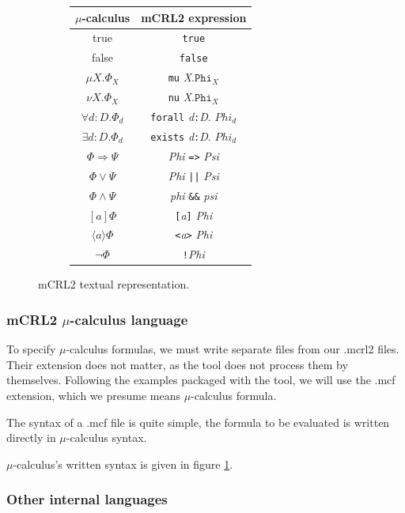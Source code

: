 \documentclass[11pt]{article}
\theoremstyle{definition}
\theoremstyle{plain}
\begin{document}
\begin{figure}
\begin{subfigure}{0.49\textwidth}
\begin{tabular}{c c}
	$ \mu $-calculus & mCRL2 expression \\
	\hline
	true & \texttt{true} \\
	false & \texttt{false} \\
	$ \mu X.\Phi_X $ & \texttt{mu} \textit{X}$ \texttt{.Phi}_\textit{X} $ \\
	$ \nu X.\Phi_X $ & \texttt{nu} \textit{X}$ \texttt{.Phi}_\textit{X} $ \\
	$ \forall d:D.\Phi_d $ & \texttt{forall} \textit{d}\texttt{:}\textit{D}. \textit{$ Phi_d $} \\
	$ \exists d:D.\Phi_d $ & \texttt{exists} \textit{d}\texttt{:}\textit{D}. \textit{$ Phi_d $} \\
	$ \Phi \Rightarrow \Psi $ & \textit{Phi} \texttt{=>} \textit{Psi} \\
	$ \Phi \vee \Psi $ & \textit{Phi} \texttt{||} \textit{Psi} \\	
	$ \Phi \wedge \Psi $ & \textit{phi} \texttt{\&\&} \textit{psi} \\
	$ [a] \Phi $ & \texttt{[}\textit{a}\texttt{]} \textit{Phi} \\
	$ \langle a\rangle \Phi $ & \texttt{<}\textit{a}\texttt{>} \textit{Phi} \\
	$ \neg \Phi $ & \texttt{!}\textit{Phi} \\
\end{tabular}
\end{subfigure}
\caption{mCRL2 textual representation.}\label{mcrl2-rep}
\end{figure}

\subsubsection{mCRL2 $ \mu $-calculus language}

To specify $ \mu $-calculus formulas, we must write separate files from our .mcrl2 files. Their extension does not matter, as the tool does not process them by themselves. Following the examples packaged with the tool, we will use the .mcf extension, which we presume means $ \mu $-calculus formula.

The syntax of a .mcf file is quite simple, the formula to be evaluated is written directly in $ \mu $-calculus syntax. 

$ \mu $-calculus's written syntax is given in figure \ref{mcrl2-rep}.

\subsubsection{Other internal languages}
\end{document}

